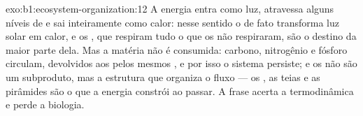 \begin{solution}{exo:b1:ecosystem-organization:12}
A energia entra como luz, atravessa alguns níveis de  e sai
inteiramente como calor: nesse sentido o  de fato
transforma luz solar em calor, e os , que respiram tudo
o que os  não respiraram, são o destino da maior parte
dela. Mas a matéria não é consumida: carbono, nitrogênio e fósforo
circulam, devolvidos aos  pelos mesmos , e por
isso o sistema persiste; e os  não são um subproduto, mas a
estrutura que organiza o fluxo --- os , as teias e as pirâmides
são o que a energia constrói ao passar. A frase acerta a termodinâmica
e perde a biologia.
\end{solution}

